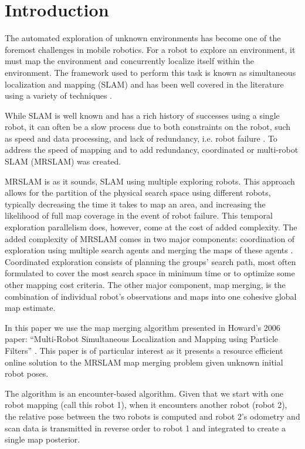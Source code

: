 \section{Introduction}
\label{S:Intro}


The automated exploration of unknown environments has become one of the foremost challenges in mobile robotics. For a robot to explore an environment, it must map the environment and concurrently localize itself within the environment.  The framework used to perform this task is known as simultaneous localization and mapping (SLAM) and has been well covered in the literature using a variety of techniques \cite{durrant2006simultaneous,bailey2006simultaneous}.

While SLAM is well known and has a rich history of successes using a single robot, it can often be a slow process due to both constraints on the robot, such as speed and data processing, and lack of redundancy, i.e. robot failure \cite{thrun2001probabilistic,burgard2005coordinated}.  To address the speed of mapping and to add redundancy, coordinated or multi-robot SLAM (MRSLAM) was created.

MRSLAM is as it sounds, SLAM using multiple exploring robots. This approach allows for the partition of the physical search space using different robots, typically decreasing the time it takes to map an area, and increasing the likelihood of full map coverage in the event of robot failure. This temporal exploration parallelism does, however, come at the cost of added complexity. The added complexity of MRSLAM comes in two major components: coordination of exploration using multiple search agents and merging the maps of these agents \cite{fox2006distributed}.  Coordinated exploration consists of planning the groups' search path, most often formulated to cover the most search space in minimum time or to optimize some other mapping cost criteria. The other major component, map merging, is the combination of individual robot's observations and maps into one cohesive global map estimate.

In this paper we use the map merging algorithm presented in Howard's 2006 paper: ``Multi-Robot Simultaneous Localization and Mapping using Particle Filters'' \cite{howard2006multi}. This paper is of particular interest as it presents a resource efficient online solution to the MRSLAM map merging problem given unknown initial robot poses.  

The algorithm is an encounter-based algorithm.  Given that we start with one robot mapping (call this robot 1), when it encounters another robot (robot 2), the relative pose between the two robots is computed and robot 2's odometry and scan data is transmitted in reverse order to robot 1 and integrated to create a single map posterior.  

